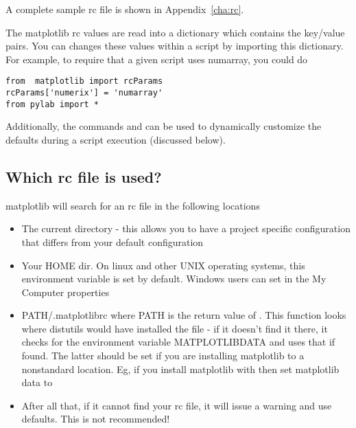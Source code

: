 \documentclass[twoside]{book}
\begin{document}
\noindent A complete sample rc file is shown in Appendix~\ref{cha:rc}.

The matplotlib rc values are read into a dictionary  which
contains the key/value pairs.  You can changes these values within a
script by importing this dictionary.  For example, to require that a
given script uses numarray, you could do

\begin{lstlisting}
from  matplotlib import rcParams
rcParams['numerix'] = 'numarray'
from pylab import *
\end{lstlisting}

\noindent Additionally, the commands  and
 can be used to dynamically customize
the defaults during a script execution (discussed below).

\subsection{Which rc file is used?}

matplotlib will search for an rc file in the following locations

\begin{itemize}
\item The current directory - this allows you to have a project
  specific configuration that differs from your default configuration

\item Your HOME dir.  On linux and other UNIX operating systems, this
  environment variable is set by default.  Windows users can set in
  the My Computer properties
  
\item PATH/.matplotlibrc where PATH is the return value of
  .  This function looks where
  distutils would have installed the file - if it doesn't find it
  there, it checks for the environment variable MATPLOTLIBDATA and
  uses that if found.  The latter should be set if you are installing
  matplotlib to a nonstandard location.  Eg, if you install matplotlib
  with  then set
  matplotlib data to 

\item After all that, if it cannot find your rc file, it will issue a
  warning and use defaults.  This is not recommended!
\end{itemize}
\end{document}
